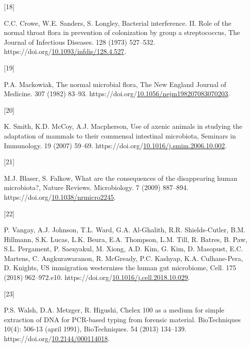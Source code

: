 \documentclass[preprint,3p,
a4paper]{elsarticle} %
\newlength{\cslhangindent}
\newlength{\csllabelwidth}
\newlength{\cslentryspacingunit} %
\newenvironment{CSLReferences}[2] %
 {%
  \setlength{\parindent}{0pt}
  \ifodd #1
  \let\oldpar\par
  \def\par{\hangindent=\cslhangindent\oldpar}
  \fi
  \setlength{\parskip}{#2\cslentryspacingunit}
 }%
 {}
\newcommand{\CSLLeftMargin}[1]{\parbox[t]{\csllabelwidth}{#1}}
\newcommand{\CSLRightInline}[1]{\parbox[t]{\linewidth - \csllabelwidth}{#1}\break}
\begin{document}
\begin{CSLReferences}{0}{0}
\leavevmode{}%
\CSLLeftMargin{{[}18{]} }%
\CSLRightInline{C.C. Crowe, W.E. Sanders, S. Longley, Bacterial
interference. II. Role of the normal throat flora in prevention of
colonization by group a streptococcus, The Journal of Infectious
Diseases. 128 (1973) 527--532.
https://doi.org/\href{https://doi.org/10.1093/infdis/128.4.527}{10.1093/infdis/128.4.527}.}

\leavevmode{}%
\CSLLeftMargin{{[}19{]} }%
\CSLRightInline{P.A. Mackowiak, The normal microbial flora, The New
England Journal of Medicine. 307 (1982) 83--93.
https://doi.org/\href{https://doi.org/10.1056/nejm198207083070203}{10.1056/nejm198207083070203}.}

\leavevmode{}%
\CSLLeftMargin{{[}20{]} }%
\CSLRightInline{K. Smith, K.D. McCoy, A.J. Macpherson, Use of axenic
animals in studying the adaptation of mammals to their commensal
intestinal microbiota, Seminars in Immunology. 19 (2007) 59--69.
https://doi.org/\href{https://doi.org/10.1016/j.smim.2006.10.002}{10.1016/j.smim.2006.10.002}.}

\leavevmode{}%
\CSLLeftMargin{{[}21{]} }%
\CSLRightInline{M.J. Blaser, S. Falkow, What are the consequences of the
disappearing human microbiota?, Nature Reviews. Microbiology. 7 (2009)
887--894.
https://doi.org/\href{https://doi.org/10.1038/nrmicro2245}{10.1038/nrmicro2245}.}

\leavevmode{}%
\CSLLeftMargin{{[}22{]} }%
\CSLRightInline{P. Vangay, A.J. Johnson, T.L. Ward, G.A. Al-Ghalith,
R.R. Shields-Cutler, B.M. Hillmann, S.K. Lucas, L.K. Beura, E.A.
Thompson, L.M. Till, R. Batres, B. Paw, S.L. Pergament, P. Saenyakul, M.
Xiong, A.D. Kim, G. Kim, D. Masopust, E.C. Martens, C. Angkurawaranon,
R. McGready, P.C. Kashyap, K.A. Culhane-Pera, D. Knights, US immigration
westernizes the human gut microbiome, Cell. 175 (2018) 962--972.e10.
https://doi.org/\href{https://doi.org/10.1016/j.cell.2018.10.029}{10.1016/j.cell.2018.10.029}.}

\leavevmode{}%
\CSLLeftMargin{{[}23{]} }%
\CSLRightInline{P.S. Walsh, D.A. Metzger, R. Higushi, Chelex 100 as a
medium for simple extraction of DNA for PCR-based typing from forensic
material. BioTechniques 10(4): 506-13 (april 1991), BioTechniques. 54
(2013) 134--139.
https://doi.org/\href{https://doi.org/10.2144/000114018}{10.2144/000114018}.}


\end{CSLReferences}
\end{document}

